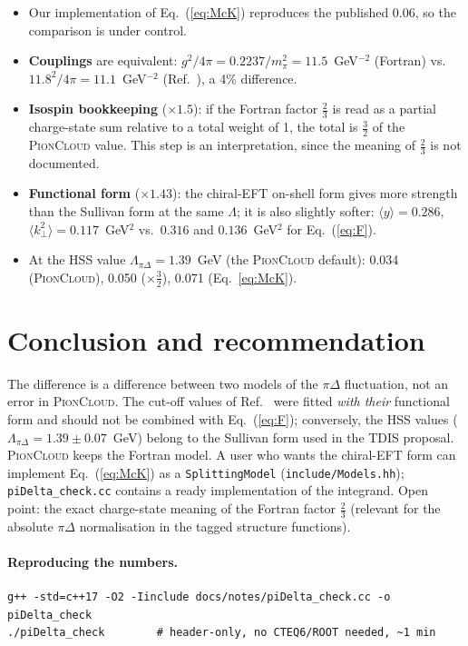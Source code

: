 \documentclass[11pt,a4paper]{article}
\newcommand{\picloud}{\textsc{PionCloud}}
\newcommand{\kT}{k_\perp}
\begin{document}
\begin{itemize}
\item Our implementation of Eq.~(\ref{eq:McK}) reproduces the published 0.06,
  so the comparison is under control.
\item \textbf{Couplings} are equivalent: $g^2/4\pi=0.2237/m_\pi^2=11.5$~GeV$^{-2}$
  (Fortran) vs.\ $11.8^2/4\pi=11.1$~GeV$^{-2}$ (Ref.~\cite{McK16}), a 4\%
  difference.
\item \textbf{Isospin bookkeeping} ($\times1.5$): if the Fortran factor
  $\tfrac23$ is read as a partial charge-state sum relative to a total weight
  of 1, the total is $\tfrac32$ of the \picloud{} value.  This step is an
  interpretation, since the meaning of $\tfrac23$ is not documented.
\item \textbf{Functional form} ($\times1.43$): the chiral-EFT on-shell form
  gives more strength than the Sullivan form at the same $\Lambda$; it is also
  slightly softer: $\langle y\rangle=0.286$, $\langle\kT^2\rangle=0.117$~GeV$^2$
  vs.\ $0.316$ and $0.136$~GeV$^2$ for Eq.~(\ref{eq:F}).
\item At the HSS value $\Lambda_{\pi\Delta}=1.39$~GeV (the \picloud{} default):
  0.034 (\picloud{}), 0.050 ($\times\tfrac32$), 0.071 (Eq.~\ref{eq:McK}).
\end{itemize}

\section{Conclusion and recommendation}

The difference is a difference between two models of the $\pi\Delta$
fluctuation, not an error in \picloud{}.  The cut-off values of
Ref.~\cite{McK16} were fitted \emph{with their} functional form and should not
be combined with Eq.~(\ref{eq:F}); conversely, the HSS values
($\Lambda_{\pi\Delta}=1.39\pm0.07$~GeV) belong to the Sullivan form used in the
TDIS proposal.  \picloud{} keeps the Fortran model.  A user who wants the
chiral-EFT form can implement Eq.~(\ref{eq:McK}) as a \texttt{SplittingModel}
(\texttt{include/Models.hh}); \texttt{piDelta\_check.cc} contains a ready
implementation of the integrand.  Open point: the exact charge-state meaning of
the Fortran factor $\tfrac23$ (relevant for the absolute $\pi\Delta$
normalisation in the tagged structure functions).

\paragraph{Reproducing the numbers.}
\begin{lstlisting}
g++ -std=c++17 -O2 -Iinclude docs/notes/piDelta_check.cc -o piDelta_check
./piDelta_check        # header-only, no CTEQ6/ROOT needed, ~1 min
\end{lstlisting}
\end{document}
